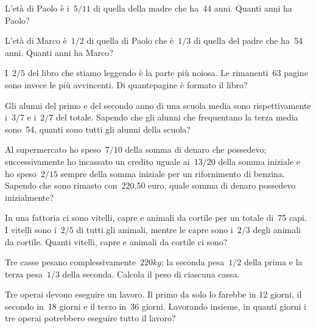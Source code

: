  \begin{multicols}{2}
\begin{esercizio}[\Ast]
 L'età di Paolo è i~$5/11$ di quella della madre che ha~44 anni. Quanti anni ha Paolo?
\end{esercizio}

\begin{esercizio}[\Ast]
L'età di Marco è~$1/2$ di quella di Paolo che è~$1/3$ di quella del padre che ha~54 anni. Quanti anni ha Marco?
\end{esercizio}

\begin{esercizio}[\Ast]
I~$2/5$ del libro che stiamo leggendo è la parte più noiosa. Le rimanenti~63 pagine sono invece le più avvincenti.
Di quantepagine è formato il libro?
\end{esercizio}

\begin{esercizio}[\Ast]
Gli alunni del primo e del secondo anno di una scuola media sono rispettivamente i~$3/7$ e i~$2/7$ del totale.
Sapendo che gli alunni che frequentano la terza media sono~54, quanti sono tutti gli alunni della scuola?
\end{esercizio}

\begin{esercizio}[\Ast]
Al supermercato ho speso~$7/10$ della somma di denaro che possedevo;
successivamente ho incassato un credito uguale ai~$13/20$ della somma
iniziale e ho speso~$2/15$ sempre della somma iniziale per un
rifornimento di benzina. Sapendo che sono rimasto con~220,50 euro,
quale somma di denaro possedevo inizialmente?
\end{esercizio}

\begin{esercizio}[\Ast]
 In una fattoria ci sono vitelli, capre e animali da cortile per
un totale di~75 capi. I vitelli sono i~$2/5$ di tutti gli animali,
mentre le capre sono i~$2/3$ degli animali da cortile. Quanti vitelli,
capre e animali da cortile ci sono?
\end{esercizio}

\begin{esercizio}[\Ast]
 Tre casse pesano complessivamente~$220\unit{kg}$; la seconda pesa~$1/2$ della
prima e la terza pesa~$1/3$ della seconda. Calcola il peso di ciascuna
cassa.

\end{esercizio}

\begin{esercizio}[\Ast]
 Tre operai devono eseguire un lavoro. Il primo da solo lo farebbe in
12 giorni, il secondo in~18 giorni e il terzo in~36 giorni. Lavorando
insieme, in quanti giorni i tre operai potrebbero eseguire tutto il
lavoro?


\end{esercizio}
\end{multicols}
